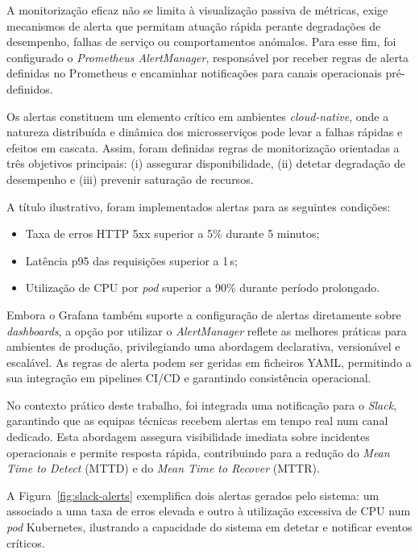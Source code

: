A monitorização eficaz não se limita à visualização passiva de métricas, exige mecanismos de alerta que permitam atuação rápida perante degradações de desempenho, falhas de serviço ou comportamentos anómalos. Para esse fim, foi configurado o \textit{Prometheus AlertManager}, responsável por receber regras de alerta definidas no Prometheus e encaminhar notificações para canais operacionais pré-definidos.

Os alertas constituem um elemento crítico em ambientes \textit{cloud-native}, onde a natureza distribuída e dinâmica dos microsserviços pode levar a falhas rápidas e efeitos em cascata. Assim, foram definidas regras de monitorização orientadas a três objetivos principais: (i) assegurar disponibilidade, (ii) detetar degradação de desempenho e (iii) prevenir saturação de recursos.

A título ilustrativo, foram implementados alertas para as seguintes condições:
\begin{itemize}
    \item Taxa de erros HTTP 5xx superior a 5\% durante 5 minutos;
    \item Latência p95 das requisições superior a 1\,s;
    \item Utilização de CPU por \textit{pod} superior a 90\% durante período prolongado.
\end{itemize}

Embora o Grafana também suporte a configuração de alertas diretamente sobre \textit{dashboards}, a opção por utilizar o \textit{AlertManager} reflete as melhores práticas para ambientes de produção, privilegiando uma abordagem declarativa, versionável e escalável. As regras de alerta podem ser geridas em ficheiros YAML, permitindo a sua integração em pipelines CI/CD e garantindo consistência operacional.

No contexto prático deste trabalho, foi integrada uma notificação para o \textit{Slack}, garantindo que as equipas técnicas recebem alertas em tempo real num canal dedicado. Esta abordagem assegura visibilidade imediata sobre incidentes operacionais e permite resposta rápida, contribuindo para a redução do \textit{Mean Time to Detect} (MTTD) e do \textit{Mean Time to Recover} (MTTR).

A Figura~\ref{fig:slack-alerts} exemplifica dois alertas gerados pelo sistema: um associado a uma taxa de erros elevada e outro à utilização excessiva de CPU num \textit{pod} Kubernetes, ilustrando a capacidade do sistema em detetar e notificar eventos críticos.

